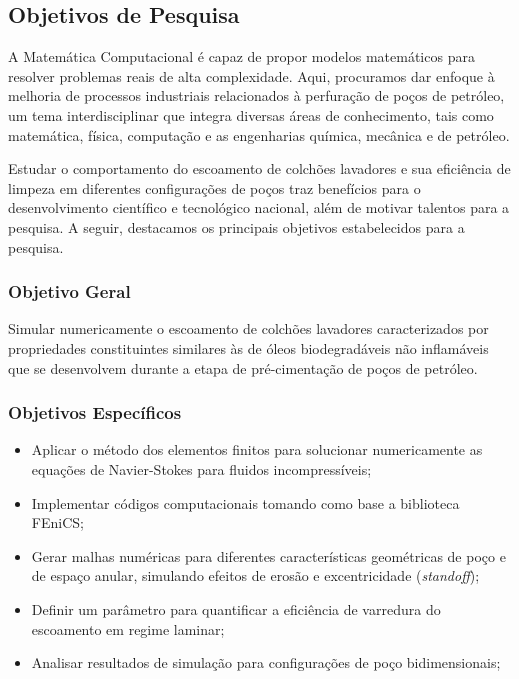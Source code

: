 \subsection{Objetivos de Pesquisa}

A Matemática Computacional é capaz de propor modelos matemáticos para resolver problemas reais de alta complexidade. Aqui, procuramos dar enfoque à melhoria de processos industriais relacionados à perfuração de poços de petróleo, um tema interdisciplinar que integra diversas áreas de conhecimento, tais como matemática, física, computação e as engenharias química, mecânica e de petróleo. 

Estudar o comportamento do escoamento de colchões lavadores e sua eficiência de limpeza em diferentes configurações de poços traz benefícios para o desenvolvimento científico e tecnológico nacional, além de motivar talentos para a pesquisa. A seguir, destacamos os principais objetivos estabelecidos para a pesquisa.

\subsubsection{Objetivo Geral}

Simular numericamente o escoamento de colchões lavadores caracterizados por propriedades constituintes similares às de óleos biodegradáveis não inflamáveis que se desenvolvem durante a etapa de pré-cimentação de poços de petróleo.

\subsubsection{Objetivos Específicos}

\begin{itemize}
	\item Aplicar o método dos elementos finitos para solucionar numericamente as equações de Navier-Stokes para fluidos incompressíveis;
	\item Implementar códigos computacionais tomando como base a biblioteca FEniCS;
	\item Gerar malhas numéricas para diferentes características geométricas de poço e de espaço anular, simulando efeitos de erosão e excentricidade (\textit{standoff});
	\item Definir um parâmetro para quantificar a eficiência de varredura do escoamento em regime laminar;
	\item Analisar resultados de simulação para configurações de poço bidimensionais;
\end{itemize}

